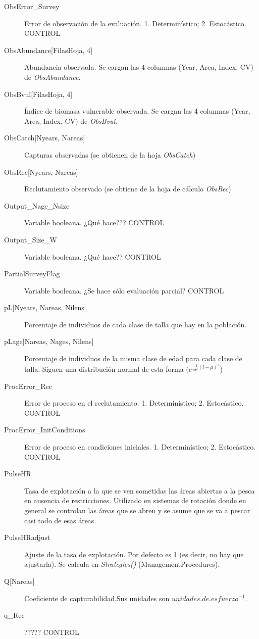 \begin{description}
		
		\item[ObsError\_Survey] Error de observación de la evaluación. 1. Determinístico; 2. Estocástico. CONTROL
		\item[ObsAbundance{[}FilasHoja, 4{]}] Abundancia observada. Se cargan las 4 columnas (Year, Area, Index, CV) de \emph{ObsAbundance}.
		\item[ObsBvul{[}FilasHoja, 4{]}] Índice de biomasa vulnerable observada. Se cargan las 4 columnas (Year, Area, Index, CV) de \emph{ObsBvul}.
		\item[ObsCatch{[}Nyears, Nareas{]}] Capturas observadas (se obtienen de la hoja \emph{ObsCatch})
		\item[ObsRec{[}Nyears, Nareas{]}] Reclutamiento observado (se obtiene de la hoja de cálculo \emph{ObsRec})
		\item[Output\_Nage\_Nsize] Variable booleana. ¿Qué hace??? CONTROL
		\item[Output\_Size\_W] Variable booleana. ¿Qué hace?? CONTROL
		
		\item[PartialSurveyFlag] Variable booleana. ¿Se hace sólo evaluación parcial? CONTROL
		\item[pL{[}Nyears, Nareas, Nilens{]}] Porcentaje de individuos de cada clase de talla que hay en la población.
		\item[pLage{[}Nareas, Nages, Nilens{]}] Porcentaje de individuos de la misma clase de edad para cada clase de talla. Siguen una distribución normal de esta forma ($e^{\frac{-1}{2 \sigma^2} (l-\mu)^2}$)		
		\item[ProcError\_Rec] Error de proceso en el reclutamiento. 1. Determinístico; 2. Estocástico. CONTROL
		\item[ProcError\_InitConditions] Error de proceso en condiciones iniciales. 1. Determinístico; 2. Estocástico. CONTROL
		\item[PulseHR] Tasa de explotación a la que se ven sometidas las áreas abiertas a la pesca en ausencia de restricciones. Utilizado en sistemas de rotación donde en general se controlan las áreas que se abren y se asume que se va a pescar casi todo de esas áreas. 
		\item[PulseHRadjust] Ajuste de la tasa de explotación. Por defecto es 1 (es decir, no hay que ajustarla). Se calcula en \emph{Strategies()} (ManagementProcedures).
		   
		\item[Q{[}Nareas{]}] Coeficiente de capturabilidad.Sus unidades son $unidades.de.esfuerzo^{-1}$.
		\item[q\_Rec] ????? CONTROL
		

\end{description}
